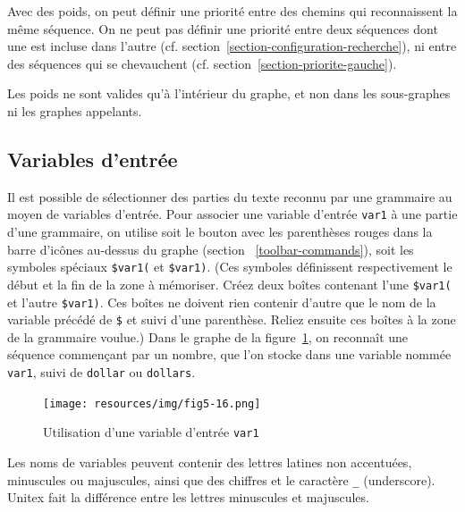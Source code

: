\bigskip
\noindent Avec des poids, on peut définir une priorité entre des chemins qui reconnaissent
la même séquence. On ne peut pas définir une priorité entre deux séquences dont une est incluse
dans l'autre (cf. section~\ref{section-configuration-recherche}), ni entre des séquences qui
se chevauchent  (cf. section~\ref{section-priorite-gauche}).

\bigskip
\noindent Les poids ne sont valides qu'à l'intérieur du graphe, et non dans les sous-graphes ni les graphes appelants. 


\subsection{Variables d'entrée}
\label{section-using-variables}
\index{\verbt{\$}}

Il est possible de sélectionner des parties du texte reconnu par une grammaire au moyen
de variables d'entrée. Pour associer une variable d'entrée \verb+var1+ à une partie d’une grammaire, on utilise
soit le bouton avec les parenthèses rouges dans la barre d'icônes au-dessus du graphe (section ~\ref{toolbar-commands}),
soit les symboles spéciaux \verb+$var1(+ et \verb+$var1)+. (Ces symboles définissent respectivement le début et
la fin de la zone à mémoriser. Créez deux boîtes contenant l’une \verb+$var1(+ et l’autre
\verb+$var1)+. Ces boîtes ne doivent rien contenir d’autre que le nom de la variable précédé de
 \verb+$+ et suivi d’une parenthèse. Reliez ensuite ces boîtes à la zone de la grammaire voulue.)
 Dans le graphe de la figure~\ref{fig-using-variable}, on reconnaît une séquence commençant par
 un nombre, que l’on stocke dans une variable nommée \verb+var1+, suivi de \verb+dollar+ ou
 \verb+dollars+.

\begin{figure}[!ht]
\begin{center}
\texttt{[image: resources/img/fig5-16.png]}
\caption{Utilisation d’une variable d'entrée
\texttt{var1}\label{fig-using-variable}}
\end{center}
\end{figure}

\bigskip
\noindent Les noms de variables peuvent contenir des lettres latines non accentuées, minuscules
ou majuscules, ainsi que des chiffres et le caractère \verb+_+ (underscore).
\index{\verbc{_}} Unitex fait la différence entre les lettres minuscules
et majuscules.

